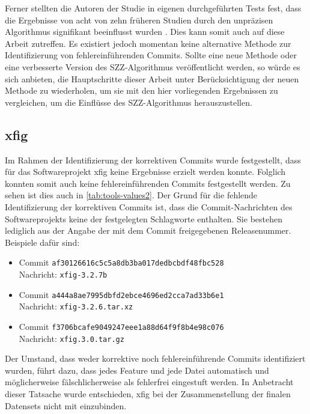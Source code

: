 Ferner stellten die Autoren der Studie in eigenen durchgeführten Tests fest, dass die Ergebnisse von acht von zehn früheren Studien durch den unpräzisen Algorithmus signifikant beeinflusst wurden \cite{Wen2019}. Dies kann somit auch auf diese Arbeit zutreffen. Es existiert jedoch momentan keine alternative Methode zur Identifizierung von fehlereinführenden Commits. Sollte eine neue Methode oder eine verbesserte Version des SZZ-Algorithmus veröffentlicht werden, so würde es sich anbieten, die Hauptschritte dieser Arbeit unter Berücksichtigung der neuen Methode zu wiederholen, um sie mit den hier vorliegenden Ergebnissen zu vergleichen, um die Einflüsse des SZZ-Algorithmus herauszustellen.

\subsection*{xfig}
\label{xfig}
Im Rahmen der Identifizierung der korrektiven Commits wurde festgestellt, dass für das Softwareprojekt xfig keine Ergebnisse erzielt werden konnte. Folglich konnten somit auch keine fehlereinführenden Commits festgestellt werden. Zu sehen ist dies auch in \autoref{tab:tools-values2}. Der Grund für die fehlende Identifizierung der korrektiven Commits ist, dass die Commit-Nachrichten des Softwareprojekts keine der festgelegten Schlagworte enthalten. Sie bestehen lediglich aus der Angabe der mit dem Commit freigegebenen Releasenummer. Beispiele dafür sind:

\begin{itemize}
\setlength{\itemsep}{-2pt}
\item Commit \texttt{af30126616c5c5a8db3ba017dedbcbdf48fbc528}\\Nachricht: \texttt{xfig-3.2.7b}
\item Commit \texttt{a444a8ae7995dbfd2ebce4696ed2cca7ad33b6e1}\\Nachricht: \texttt{xfig-3.2.6.tar.xz}
\item Commit \texttt{f3706bcafe9049247eee1a88d64f9f8b4e98c076}\\Nachricht: \texttt{xfig.3.0.tar.gz}
\end{itemize}

Der Umstand, dass weder korrektive noch fehlereinführende Commits identifiziert wurden, führt dazu, dass jedes Feature und jede Datei automatisch und möglicherweise fälschlicherweise als \glqq fehlerfrei\grqq{} eingestuft werden. In Anbetracht dieser Tatsache wurde entschieden, xfig bei der Zusammenstellung der finalen Datensets nicht mit einzubinden.

